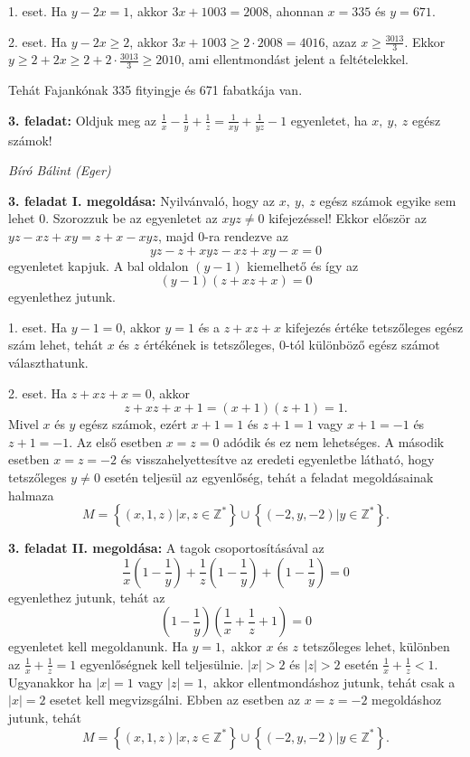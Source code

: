 \documentclass[a4paper,10pt]{article}
\def\ki#1#2{\hfill {\it #1 (#2)}\medskip}
\begin{document}
1. eset.  Ha  $y-2x=1$, akkor  $3x+1003=2008$, ahonnan $x=335$ és
$y=671$.

2. eset.  Ha  $y-2x\ge2$, akkor  $3x+1003\ge2\cdot2008=4016$, azaz
$x\ge\frac{3013}{3}$. Ekkor
$y\ge2+2x\ge2+2\cdot\frac{3013}{3}\ge2010$, ami ellentmondást jelent
a feltételekkel.

Tehát Fajankónak 335 fityingje és 671 fabatkája van.

\medskip

{\bf 3. feladat: } Oldjuk meg az
$\displaystyle{\frac{1}{x}-\frac{1}{y}+\frac{1}{z}=\frac{1}{xy}+\frac{1}{yz}-1}$
egyenletet, ha $x,\ y,\ z$ egész számok!

\ki{Bíró Bálint}{Eger}\medskip

{\bf 3. feladat I. megoldása: } Nyilvánvaló, hogy az $x,\ y,\ z $ egész számok egyike sem lehet 0.
Szorozzuk be az egyenletet az $xyz\neq0$  kifejezéssel! Ekkor
először az $yz-xz+xy=z+x-xyz$, majd 0-ra rendezve az
\[yz-z+xyz-xz+xy-x=0\]
egyenletet kapjuk. A bal oldalon $(y-1)$ kiemelhető és így az
$$(y-1)(z+xz+x)=0$$ egyenlethez jutunk.

1. eset. Ha $y-1=0$, akkor $y=1$ és a $z+xz+x$ kifejezés értéke
tetszőleges egész szám lehet, tehát $x$ és $z$ értékének is
tetszőleges, $0$-tól különböző egész számot választhatunk.

2. eset. Ha $z+xz+x=0$, akkor $$z+xz+x+1=(x+1)(z+1)=1.$$ Mivel $x$
és $y$ egész számok, ezért $x+1=1$ és $z+1=1$ vagy  $x+1=-1$ és
$z+1=-1.$ Az első esetben $x=z=0$ adódik és ez nem
lehetséges. A második esetben $x=z=-2$ és
visszahelyettesítve az eredeti egyenletbe látható, hogy
tetszőleges $y\neq0$ esetén teljesül az egyenlőség,
tehát a feladat megoldásainak halmaza
$$M=\left \{(x,1,z)|x,z\in \mathbb{Z}^*\right \}\cup \left \{(-2,y,-2)|y\in\mathbb{Z}^*\right \}.$$

\medskip

{\bf 3. feladat II. megoldása: } A tagok csoportosításával az
$$\frac 1x \left(1-\frac 1y \right)+\frac 1z \left(1-\frac 1y \right)+ \left(1-\frac 1y \right)=0$$
egyenlethez jutunk, tehát az $$ \left(1-\frac 1y \right)\left(
\frac 1x+\frac 1z+1\right)=0$$ egyenletet kell megoldanunk. Ha
$y=1,$ akkor $x$ és $z$ tetszőleges lehet, különben az
$\frac 1x+\frac 1z=1$ egyenlőségnek kell teljesülnie. $|x|>2$
és $|z|>2$ esetén $\frac 1x+\frac 1z<1.$ Ugyanakkor ha $|x|=1$
vagy $|z|=1,$ akkor ellentmondáshoz jutunk, tehát csak a $|x|=2$
esetet kell megvizsgálni. Ebben az esetben az $x=z=-2$
megoldáshoz jutunk, tehát
$$M=\left \{(x,1,z)|x,z\in \mathbb{Z}^*\right \}\cup \left \{(-2,y,-2)|y\in\mathbb{Z}^*\right \}.$$
\end{document}
